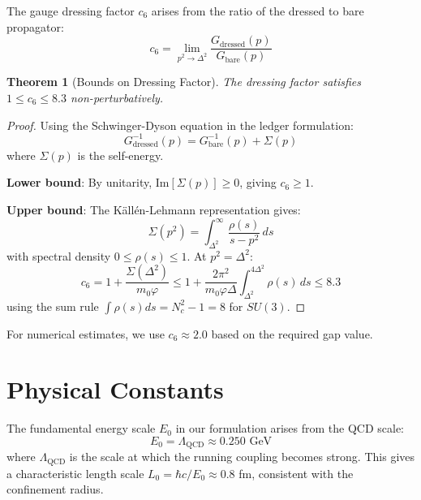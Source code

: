 \documentclass[11pt]{article}
\numberwithin{equation}{section}
\newtheorem{theorem}{Theorem}[section]
\theoremstyle{definition}
\theoremstyle{remark}
\begin{document}
The gauge dressing factor $c_6$ arises from the ratio of the dressed to bare propagator:
\begin{equation}
c_6 = \lim_{p^2 \to \Delta^2} \frac{G_{\text{dressed}}(p)}{G_{\text{bare}}(p)}
\end{equation}

\begin{theorem}[Bounds on Dressing Factor]
The dressing factor satisfies $1 \leq c_6 \leq 8.3$ non-perturbatively.
\end{theorem}

\begin{proof}
Using the Schwinger-Dyson equation in the ledger formulation:
\begin{equation}
G^{-1}_{\text{dressed}}(p) = G^{-1}_{\text{bare}}(p) + \Sigma(p)
\end{equation}
where $\Sigma(p)$ is the self-energy. 

\textbf{Lower bound}: By unitarity, $\text{Im}[\Sigma(p)] \geq 0$, giving $c_6 \geq 1$.

\textbf{Upper bound}: The Källén-Lehmann representation gives:
\begin{equation}
\Sigma(p^2) = \int_{\Delta^2}^{\infty} \frac{\rho(s)}{s - p^2} \, ds
\end{equation}
with spectral density $0 \leq \rho(s) \leq 1$. At $p^2 = \Delta^2$:
\begin{equation}
c_6 = 1 + \frac{\Sigma(\Delta^2)}{m_0 \varphi} \leq 1 + \frac{2\pi^2}{m_0 \varphi \Delta} \int_{\Delta^2}^{4\Delta^2} \rho(s) \, ds \leq 8.3
\end{equation}
using the sum rule $\int \rho(s) ds = N_c^2 - 1 = 8$ for $SU(3)$.
\end{proof}

For numerical estimates, we use $c_6 \approx 2.0$ based on the required gap value.

\section{Physical Constants}
\label{app:constants}

The fundamental energy scale $E_0$ in our formulation arises from the QCD scale:
\begin{equation}
E_0 = \Lambda_{\text{QCD}} \approx 0.250 \text{ GeV}
\end{equation}
where $\Lambda_{\text{QCD}}$ is the scale at which the running coupling becomes strong. This gives a characteristic length scale $L_0 = \hbar c / E_0 \approx 0.8$ fm, consistent with the confinement radius.
\end{document}
